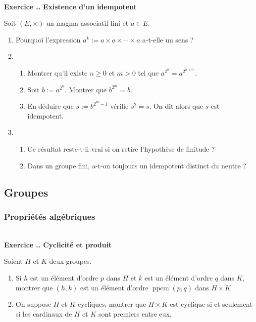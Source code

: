 \documentclass{article}
\newcounter{exo}
\newcommand{\exercice}[1][\null]{\textbf{\\ Exercice \thesection.\theexo. #1} \addtocounter{exo}{1}}
\begin{document}
\exercice[Existence d'un idempotent]

Soit $(E, \times)$ un magma associatif fini et $a \in E$.

\begin{enumerate}

\item Pourquoi l'expression $a^k := a \times a \times \cdots \times a$ a-t-elle un sens ?

\item \begin{enumerate} \item Montrer qu'il existe $n \ge 0 $ et $m > 0$ tel que $a^{2^n} = a^{2^{n+m}}$.

\item Soit $b := a^{2^{n}}$. Montrer que $b^{2^{m}} = b$. 

\item En déduire que $s := b^{2^{m}-1}$ vérifie $s^2 = s$. On dit alors que $s$ est idempotent.

\end{enumerate}

\item \begin{enumerate}

\item Ce résultat reste-t-il vrai si on retire l'hypothèse de finitude ?

\item Dans un groupe fini, a-t-on toujours un idempotent distinct du neutre ?

\end{enumerate}

\end{enumerate}

\subsection{Groupes}

\subsubsection{Propriétés algébriques}

\exercice[Cyclicité et produit]

Soient $H$ et $K$ deux groupes.

\begin{enumerate}
    \item Si $h$ est un élément d'ordre $p$ dans $H$
        et $k$ est un élément d'ordre $q$ dans $K$, montrer 
        que $(h,k)$ est un élément d'ordre $\operatorname{ppcm} (p,q)$
        dans $H \times K$

    \item On suppose $H$ et $K$ cycliques, montrer que 
        $H \times K$ est cyclique si et seulement si les cardinaux 
        de $H$ et $K$ sont premiers entre eux.
\end{enumerate}
\end{document}

